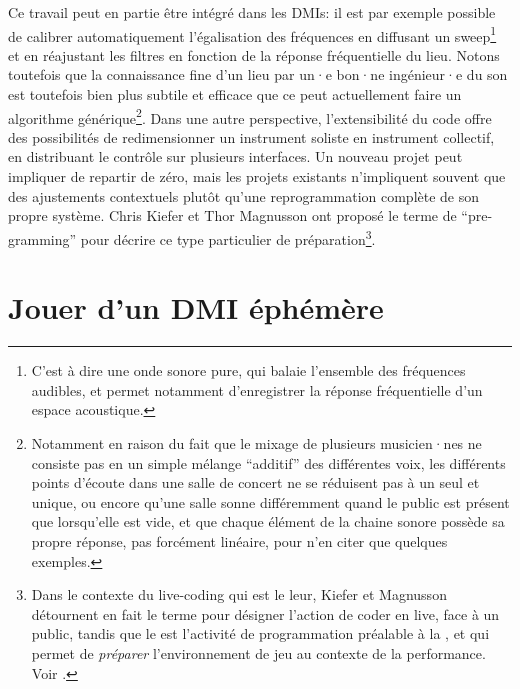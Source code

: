 \indent Ce travail peut en partie être intégré dans les \glspl{DMI}: il est par exemple possible de calibrer automatiquement l'égalisation des fréquences en diffusant un sweep\footnote{C'est à dire une onde sonore pure, qui balaie l'ensemble des fréquences audibles, et permet notamment d'enregistrer la réponse fréquentielle d'un espace acoustique.} et en réajustant les filtres en fonction de la réponse fréquentielle du lieu. Notons toutefois que la connaissance fine d'un lieu par un·e bon·ne ingénieur·e du son est toutefois bien plus subtile et efficace que ce peut actuellement faire un algorithme générique\footnote{Notamment en raison du fait que le mixage de plusieurs musicien·nes ne consiste pas en un simple mélange ``additif'' des différentes voix, les différents points d'écoute dans une salle de concert ne se réduisent pas à un seul et unique, ou encore qu'une salle sonne différemment quand le public est présent que lorsqu'elle est vide, et que chaque élément de la chaine sonore possède sa propre réponse, pas forcément linéaire, pour n'en citer que quelques exemples.}. Dans une autre perspective, l'extensibilité du code offre des possibilités de redimensionner un instrument soliste en instrument collectif, en distribuant le contrôle sur plusieurs interfaces. Un nouveau projet peut impliquer de repartir de zéro, mais les projets existants n'impliquent souvent que des ajustements contextuels plutôt qu'une reprogrammation complète de son propre système. Chris Kiefer et Thor Magnusson ont proposé le terme de ``pre-gramming'' pour décrire ce type particulier de préparation\footnote{Dans le contexte du live-coding qui est le leur, Kiefer et Magnusson détournent en fait le terme  pour désigner l'action de coder en live, face à un public, tandis que le  est l'activité de programmation préalable à la , et qui permet de \textit{préparer} l'environnement de jeu au contexte de la performance. Voir \cite{kiefer_live_2019}.}.
	

\section{Jouer d'un DMI éphémère}
\label{sec:ephemeral:playing-a-DMI}

